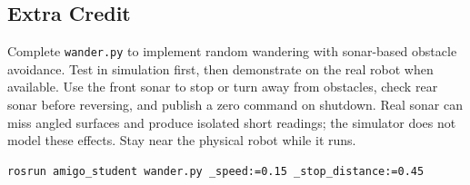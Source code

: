 \documentclass[12pt]{article}
\begin{document}
\subsection*{Extra Credit}

Complete \texttt{wander.py} to implement random wandering with sonar-based
obstacle avoidance. Test in simulation first, then demonstrate on the real
robot when available. Use the front sonar to stop or turn away from
obstacles, check rear sonar before reversing, and publish a zero command
on shutdown. Real sonar can miss angled surfaces and produce isolated
short readings; the simulator does not model these effects. Stay near the
physical robot while it runs.

\begin{tcolorbox}
\begin{lstlisting}[language=bash]
rosrun amigo_student wander.py _speed:=0.15 _stop_distance:=0.45
\end{lstlisting}
\end{tcolorbox}
\end{document}
